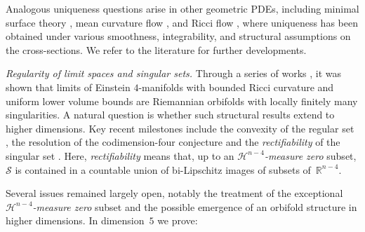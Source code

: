 \documentclass[11pt,reqno]{amsart}
\numberwithin{equation}{section}
\newcommand{\cH}{\mathcal{H}}
\newcommand{\cS}{\mathcal{S}}
\theoremstyle{definition}
\theoremstyle{remark}
\begin{document}
Analogous uniqueness questions arise in other geometric PDEs, including minimal surface theory \cite{aa,sim,whi,sim94,sze20b,cl,ftw}, mean curvature flow \cite{sch14,cim,cm15,cs21,cm23,lz,bl}, and Ricci flow \cite{sw,cmz,lw,cm25,fla}, where uniqueness has been obtained under various smoothness, integrability, and structural assumptions on the cross-sections. We refer to the literature for further developments.


\emph{Regularity of limit spaces and singular sets.} 
Through a series of works \cite{and,bkn,tia,cn}, it was shown that limits of Einstein $4$-manifolds with bounded Ricci curvature and uniform lower volume bounds are Riemannian orbifolds with locally finitely many singularities.  
A natural question is whether such structural results extend to higher dimensions.  
Key recent milestones include the convexity of the regular set \cite{con12}, the resolution of the codimension-four conjecture \cite{cn} and the \emph{rectifiability} of the singular set  \cite{cjn,jn}. Here, \emph{rectifiability} means that, up to an \emph{$\cH^{n-4}$-measure zero} subset, $\cS$ is contained in a countable union of bi-Lipschitz images of subsets of~$\mathbb{R}^{n-4}$.

Several issues remained largely open, notably the treatment of the exceptional \emph{$\cH^{n-4}$-measure zero} subset and the possible emergence of an orbifold structure in higher dimensions. In dimension~$5$ we prove:  
\end{document}
